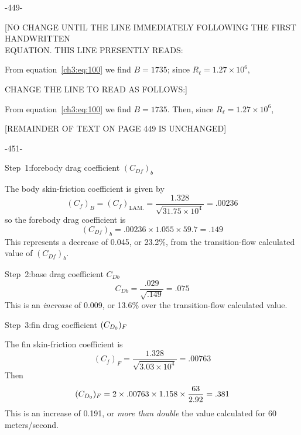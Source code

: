 \bigskip
\begin{center}
-449-
\end{center}

\begin{center}
[NO CHANGE UNTIL THE LINE IMMEDIATELY FOLLOWING THE FIRST HANDWRITTEN\\
EQUATION. THIS LINE PRESENTLY READS:

\medskip
From equation~\eqref{ch3:eq:100} we find $B = 1735$; since $R_\ell = 1.27 \times 10^{6}$,

\medskip
CHANGE THE LINE TO READ AS FOLLOWS:]
\end{center}

\noindent From equation~\eqref{ch3:eq:100} we find $B = 1735$. Then, since $R_\ell = 1.27 \times 10^{6}$,

\begin{center}
[REMAINDER OF TEXT ON PAGE 449 IS UNCHANGED]
\end{center}

\bigskip
\begin{center}
-451-
\end{center}

\noindent Step~1:\quad forebody drag coefficient $(C_{Df})_b$

\noindent The body skin-friction coefficient is given by
\begin{equation*}
(C_f)_B = (C_f)_{\mathrm{LAM.}} = \frac{1.328}{\sqrt{31.75 \times 10^{4}}} = .00236
\end{equation*}
so the forebody drag coefficient is
\begin{equation*}
(C_{Df})_b = .00236 \times 1.055 \times 59.7 = .149
\end{equation*}
This represents a decrease of 0.045, or 23.2\%, from the transition-flow calculated value of
$(C_{Df})_b$.

\medskip\noindent Step~2:\quad base drag coefficient $C_{Db}$
\begin{equation*}
C_{Db} = \frac{.029}{\sqrt{.149}} = .075
\end{equation*}
This is an \emph{increase} of 0.009, or 13.6\% over the transition-flow calculated value.

\medskip\noindent Step~3:\quad fin drag coefficient $(C_{D_0})_F$

\noindent The fin skin-friction coefficient is
\begin{equation*}
(C_f)_F = \frac{1.328}{\sqrt{3.03 \times 10^{4}}} = .00763
\end{equation*}
Then
\begin{equation*}
(C_{D_0})_F = 2 \times .00763 \times 1.158 \times \frac{63}{2.92} = .381
\end{equation*}
This is an increase of 0.191, or \emph{more than double} the value calculated for 60
meters/second.

